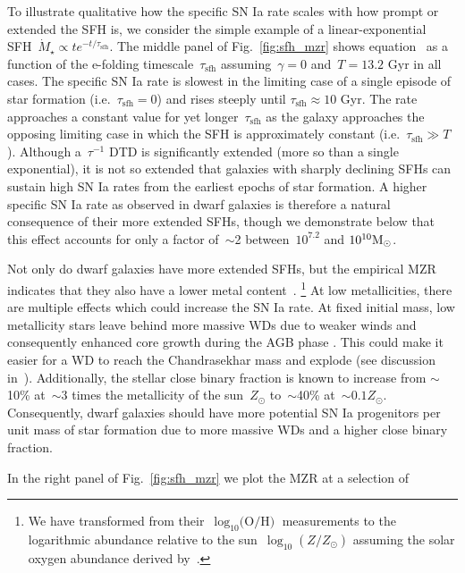 \documentclass[ms.tex]{subfiles}
\begin{document}
To illustrate qualitative how the specific SN Ia rate scales with how prompt or
extended the SFH is, we consider the simple example of a linear-exponential
SFH~$\dot{M}_\star \propto te^{-t/\tau_\text{sfh}}$.
The middle panel of Fig.~\ref{fig:sfh_mzr} shows equation~ as
a function of the e-folding timescale~$\tau_\text{sfh}$ assuming~$\gamma = 0$
and~$T = 13.2$ Gyr in all cases.
The specific SN Ia rate is slowest in the limiting case of a single episode of
star formation (i.e.~$\tau_\text{sfh} = 0$) and rises steeply until
$\tau_\text{sfh} \approx 10$ Gyr.
The rate approaches a constant value for yet longer~$\tau_\text{sfh}$ as the
galaxy approaches the opposing limiting case in which the SFH is approximately
constant (i.e.~$\tau_\text{sfh} \gg T$).
Although a~$\tau^{-1}$ DTD is significantly extended (more so than a single
exponential), it is not so extended that galaxies with sharply declining SFHs
can sustain high SN Ia rates from the earliest epochs of star formation.
A higher specific SN Ia rate as observed in dwarf galaxies is therefore a
natural consequence of their more extended SFHs, though we demonstrate below
that this effect accounts for only a factor of~$\sim$2 between~$10^{7.2}$ and
$10^{10} \text{M}_\odot$.
\par
Not only do dwarf galaxies have more extended SFHs, but the empirical MZR
indicates that they also have a lower metal content~\citep{Tremonti2004,
Gallazzi2005, Zahid2011, Kirby2013}.
\footnote{
	We have transformed from their~$\log_{10}\text{(O/H)}$ measurements to the
	logarithmic abundance relative to the sun~$\log_{10}(Z / Z_\odot)$ assuming
	the solar oxygen abundance derived by~\citet{Asplund2009}.
}
At low metallicities, there are multiple effects which could increase the SN Ia
rate.
At fixed initial mass, low metallicity stars leave behind more massive WDs due
to weaker winds and consequently enhanced core growth during the AGB phase
\citep{Umeda1999, Willson2000, Marigo2007, Meng2008, Zhao2012, Kalirai2014}.
This could make it easier for a WD to reach the Chandrasekhar mass and explode
(see discussion in~\citealt{Kistler2013}).
Additionally, the stellar close binary fraction is known to increase from
$\sim$10\% at~$\sim$3 times the metallicity of the sun~$Z_\odot$ to~$\sim$40\%
at~$\sim0.1 Z_\odot$.
Consequently, dwarf galaxies should have more potential SN Ia progenitors per
unit mass of star formation due to more massive WDs and a higher close binary
fraction.
\par
In the right panel of Fig.~\ref{fig:sfh_mzr} we plot the MZR at a selection of
\end{document}
